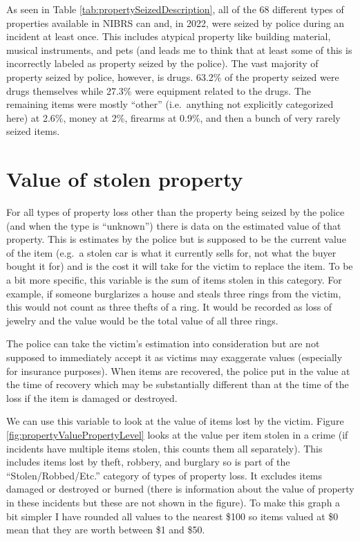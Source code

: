 \documentclass[
]{krantz}
\begin{document}
As seen in Table \ref{tab:propertySeizedDescription}, all of
the 68 different types of properties available in NIBRS can
and, in 2022, were seized by police during an incident at
least once. This includes atypical property like building
material, musical instruments, and pets (and leads me to
think that at least some of this is incorrectly labeled as
property seized by the police). The vast majority of
property seized by police, however, is drugs. 63.2\% of the
property seized were drugs themselves while 27.3\% were
equipment related to the drugs. The remaining items were
mostly ``other'' (i.e.~anything not explicitly categorized
here) at 2.6\%, money at 2\%, firearms at 0.9\%, and then a
bunch of very rarely seized items.

\section{Value of stolen
property}\label{value-of-stolen-property}

For all types of property loss other than the property being
seized by the police (and when the type is ``unknown'')
there is data on the estimated value of that property. This
is estimates by the police but is supposed to be the current
value of the item (e.g.~a stolen car is what it currently
sells for, not what the buyer bought it for) and is the cost
it will take for the victim to replace the item. To be a bit
more specific, this variable is the sum of items stolen in
this category. For example, if someone burglarizes a house
and steals three rings from the victim, this would not count
as three thefts of a ring. It would be recorded as loss of
jewelry and the value would be the total value of all three
rings.

The police can take the victim's estimation into
consideration but are not supposed to immediately accept it
as victims may exaggerate values (especially for insurance
purposes). When items are recovered, the police put in the
value at the time of recovery which may be substantially
different than at the time of the loss if the item is
damaged or destroyed.

We can use this variable to look at the value of items lost
by the victim. Figure \ref{fig:propertyValuePropertyLevel}
looks at the value per item stolen in a crime (if incidents
have multiple items stolen, this counts them all
separately). This includes items lost by theft, robbery, and
burglary so is part of the ``Stolen/Robbed/Etc.'' category
of types of property loss. It excludes items damaged or
destroyed or burned (there is information about the value of
property in these incidents but these are not shown in the
figure). To make this graph a bit simpler I have rounded all
values to the nearest \$100 so items valued at \$0 mean that
they are worth between \$1 and \$50.
\end{document}
